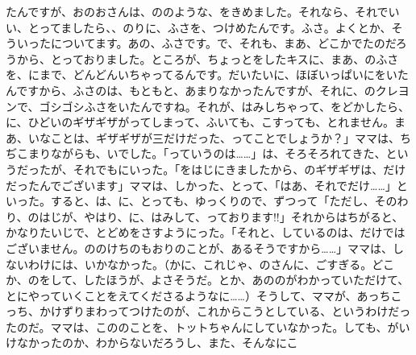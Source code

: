 たんですが、おのおさんは、ののような、をきめました。それなら、それでいい、とってましたら、、のりに、ふさを、つけめたんです。ふさ。よくとか、そういったについてます。あの、ふさです。で、それも、まあ、どこかでたのだろうから、とっておりました。ところが、ちょっとをしたキスに、まあ、のふさを、にまで、どんどんいちゃってるんです。だいたいに、ほぼいっぱいにをいたんですから、ふさのは、もともと、あまりなかったんですが、それに、のクレヨンで、ゴシゴシふさをいたんですね。それが、はみしちゃって、をどかしたら、に、ひどいのギザギザがってしまって、ふいても、こすっても、とれません。まあ、いなことは、ギザギザが三だけだった、ってことでしょうか？」ママは、ちぢこまりながらも、いでした。「っていうのは……」は、そろそろれてきた、というだったが、それでもにいった。「をはじにきましたから、のギザギザは、だけだったんでございます」ママは、しかった、とって、「はあ、それでだけ……」といった。すると、は、に、とっても、ゆっくりので、ずつって「ただし、そのわり、のはじが、やはり、に、はみして、っております!!」それからはちがると、かなりたいじで、とどめをさすようにった。「それと、しているのは、だけではございません。ののけちのもおりのことが、あるそうですから……」ママは、しないわけには、いかなかった。（かに、これじゃ、のさんに、ごすぎる。どこか、のをして、したほうが、よさそうだ。とか、あののがわかっていただけて、とにやっていくことをえてくださるようなに……）そうして、ママが、あっちこっち、かけずりまわってつけたのが、これからこうとしている、というわけだったのだ。ママは、こののことを、トットちゃんにしていなかった。しても、がいけなかったのか、わからないだろうし、また、そんなにこ